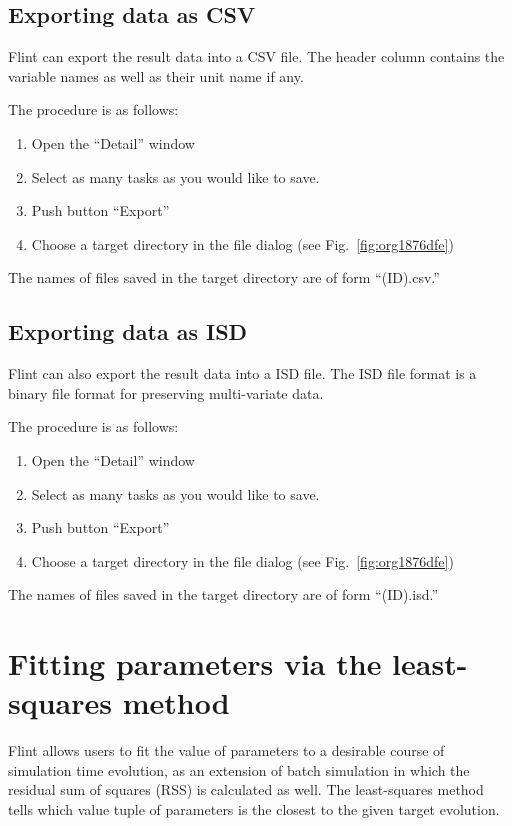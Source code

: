 \documentclass[a4paper,10pt]{report}
\begin{document}
\subsection{Exporting data as CSV}
\label{sec:orgb3be455}
Flint can export the result data into a CSV file.
The header column contains the variable names as well as their unit name if any.

The procedure is as follows:

\begin{enumerate}
\item Open the ``Detail'' window
\item Select as many tasks as you would like to save.
\item Push button ``Export''
\item Choose a target directory in the file dialog (see Fig.~\ref{fig:org1876dfe})
\end{enumerate}

The names of files saved in the target directory are of form ``(ID).csv.''

\subsection{Exporting data as ISD}
\label{sec:org13d38bc}
Flint can also export the result data into a ISD file.
The ISD file format is a binary file format for preserving multi-variate data.

The procedure is as follows:

\begin{enumerate}
\item Open the ``Detail'' window
\item Select as many tasks as you would like to save.
\item Push button ``Export''
\item Choose a target directory in the file dialog (see Fig.~\ref{fig:org1876dfe})
\end{enumerate}

The names of files saved in the target directory are of form ``(ID).isd.''

\section{Fitting parameters via the least-squares method}
\label{sec:org507753b}
Flint allows users to fit the value of parameters to a desirable course of
simulation time evolution, as an extension of batch simulation in which
the residual sum of squares (RSS) is calculated as well. The least-squares
method tells which value tuple of parameters is the closest to the given
target evolution.
\end{document}
